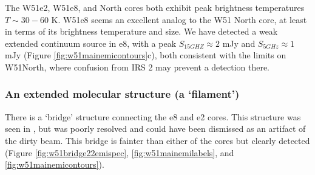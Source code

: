 
The W51e2, W51e8, and North cores both exhibit peak brightness temperatures
$T\sim30-60$ K.  W51e8 seems an excellent analog to the W51 North core, at
least in terms of its brightness temperature and size.  We have detected a weak
extended continuum source in e8, with a peak $S_{15 GHZ} \approx 2$ mJy and
$S_{5 GHz} \approx 1$ mJy (Figure \ref{fig:w51mainemicontours}c), both
consistent with the limits on W51North, where confusion from IRS 2 may prevent
a detection there.

\subsubsection{An extended molecular structure (a `filament')}
\label{sec:bridgefilament}
There is a `bridge' structure connecting the e8 and e2 cores.  This structure
was seen in \citet{Zhang1997a}, but was poorly resolved and could have been
dismissed as an artifact of the dirty beam.  This bridge is fainter than either
of the cores but clearly detected (Figure \ref{fig:w51bridge22emispec},
\ref{fig:w51mainemilabels}, and \ref{fig:w51mainemicontours}).




